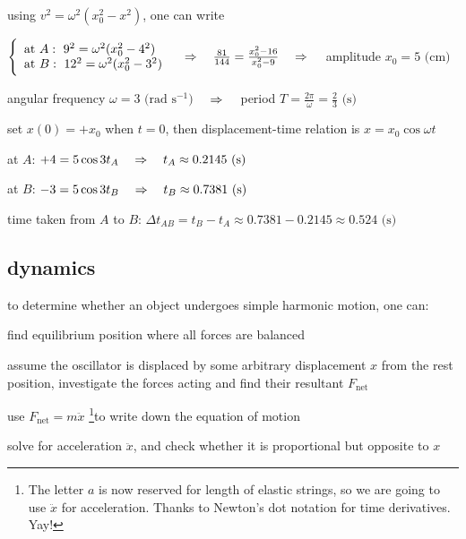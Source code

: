 
using $v^2 = \omega^2 (x_0^2 - x^2)$, one can write

$\Bigg\{\begin{array}{l}
 \text{at }A: \text{ } 9^2 = \omega^2 (x_0^2 - 4^2) \\
 \text{at }B: \text{ } 12^2 = \omega^2 (x_0^2 - 3^2)
\end{array} \quad \Rightarrow \quad \frac{81}{144} = \frac{x_0^2 - 16}{x_0^2 - 9} \quad \Rightarrow \quad $ amplitude $x_0 = 5 \text{ (cm)}$

angular frequency $\omega = 3 \text{ (rad s$^{-1}$)}$ $\quad \Rightarrow \quad$ period $T=\frac{2\pi}{\omega} = \frac{2}{3} \text{ (s)}$

set $x(0)=+x_0$ when $t=0$, then displacement-time relation is $x=x_0\cos\omega t$

at $A$: $+4 = 5\cos3t_A \quad \Rightarrow \quad t_A \approx 0.2145 \text{ (s)}$

at $B$: $-3 = 5\cos3t_B \quad \Rightarrow \quad t_B \approx 0.7381 \text{ (s)}$

time taken from $A$ to $B$: $\Delta t_{AB} = t_B - t_A \approx 0.7381 - 0.2145 \approx 0.524 \text{ (s)}$ \eoe


\subsection{dynamics}

to determine whether an object undergoes simple harmonic motion, one can:

\begin{compactenum}
	\item find equilibrium position where all forces are balanced
	
	\item assume the oscillator is displaced by some arbitrary displacement $x$ from the rest position, investigate the forces acting and find their resultant $F_\text{net}$
	
	\item use $F_\text{net} = m\ddot{x}$ \footnote{The letter $a$ is now reserved for length of elastic strings, so we are going to use $\ddot{x}$ for acceleration. Thanks to Newton's dot notation for time derivatives. Yay!}to write down the equation of motion
	
	\item solve for acceleration $\ddot{x}$, and check whether it is proportional but opposite to $x$
\end{compactenum}

